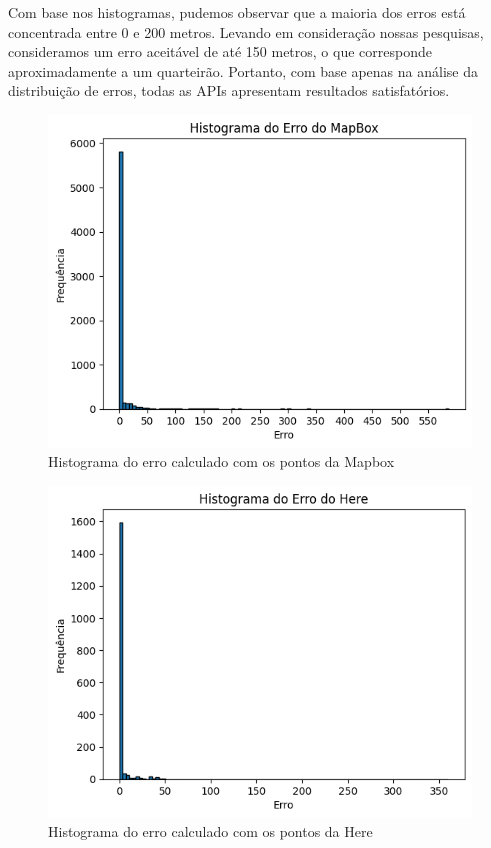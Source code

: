 Com base nos histogramas, pudemos observar que a maioria dos erros está concentrada entre 0 e 200 metros. Levando em consideração nossas pesquisas, consideramos um erro aceitável de até 150 metros, o que corresponde aproximadamente a um quarteirão. Portanto, com base apenas na análise da distribuição de erros, todas as APIs apresentam resultados satisfatórios.

\begin{figure}[h]
  \centering
  \includegraphics[width=\textwidth]{Figuras/hist1.png}
  \caption{Histograma do erro calculado com os pontos da Mapbox}
  \label{fig:hist1}
\end{figure}

\begin{figure}[h]
  \centering
  \includegraphics[width=\textwidth]{Figuras/hist2.png}
  \caption{Histograma do erro calculado com os pontos da Here}
  \label{fig:hist2}
\end{figure}

